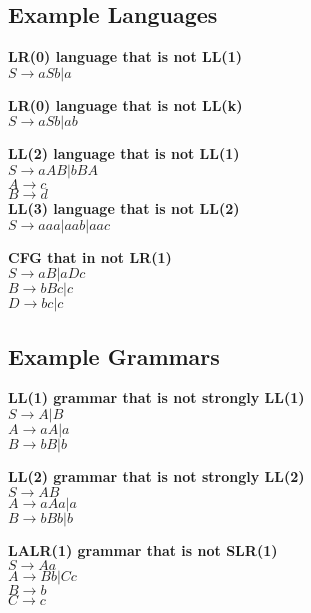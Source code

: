 \subsection{Example Languages}
\textbf{LR(0) language that is not LL(1)}\\
    $S \rightarrow aSb | a$

\textbf{LR(0) language that is not LL(k)}\\
    $S \rightarrow aSb | ab$

\textbf{LL(2) language that is not LL(1)}\\
    $S \rightarrow aAB | bBA$\\
    $A \rightarrow c$\\
    $B \rightarrow d$\\

\textbf{LL(3) language that is not LL(2)}\\
    $S \rightarrow aaa | aab | aac$

\textbf{CFG that in not LR(1)}\\
    $S\rightarrow aB|aDc$\\
    $B\rightarrow bBc|c$\\
    $D\rightarrow bc|c$

\subsection{Example Grammars}
\textbf{LL(1) grammar that is not strongly LL(1)}\\
    $S \rightarrow A | B$\\
    $A \rightarrow aA | a$\\
    $B \rightarrow bB | b$

\textbf{LL(2) grammar that is not strongly LL(2)}\\
    $S \rightarrow A B$\\
    $A \rightarrow a A a | a$\\
    $B \rightarrow b B b | b$

\textbf{LALR(1) grammar that is not SLR(1)}\\
    $S \rightarrow A a$\\
    $A \rightarrow B b | C c$\\
    $B \rightarrow b$\\
    $C \rightarrow c$
    